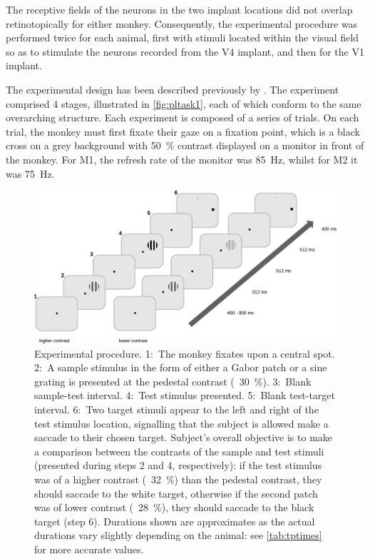 The receptive fields of the neurons in the two implant locations did not overlap retinotopically for either monkey.
Consequently, the experimental procedure was performed twice for each animal, first with stimuli located within the visual field so as to stimulate the neurons recorded from the \ac{V4} implant, and then for the \ac{V1} implant.

The experimental design has been described previously by \cite{Chen2013,Chen2014}.
The experiment comprised 4 stages, illustrated in \autoref{fig:pltask1}, each of which conform to the same overarching structure.
Each experiment is composed of a series of trials.
On each trial, the monkey must first fixate their gaze on a fixation point, which is a black cross on a grey background with \SI{50}{\percent} contrast displayed on a monitor in front of the monkey.
For \ac{M1}, the refresh rate of the monitor was \SI{85}{Hz}, whilst for \ac{M2} it was \SI{75}{Hz}.

\begin{figure}[htbp]
\begin{center}
\includegraphics[width=\linewidth]{figs/info/PLtask1.pdf}
\end{center}
\caption{
Experimental procedure.
1:~The monkey fixates upon a central spot.
2:~A sample stimulus in the form of either a Gabor patch or a sine grating is presented at the pedestal contrast (\eg{}~\SI{30}{\percent}).
3:~Blank sample-test interval.
4:~Test stimulus presented.
5:~Blank test-target interval.
6:~Two target stimuli appear to the left and right of the test stimulus location, signalling that the subject is allowed make a saccade to their chosen target.
Subject's overall objective is to make a comparison between the contrasts of the sample and test stimuli (presented during steps 2 and 4, respectively): if the test stimulus was of a higher contrast (\eg{}~\SI{32}{\percent}) than the pedestal contrast, they should saccade to the white target, otherwise if the second patch was of lower contrast (\eg{}~\SI{28}{\percent}), they should saccade to the black target (step 6).
Durations shown are approximates as the actual durations vary slightly depending on the animal: see \autoref{tab:tptimes} for more accurate values.}
\label{fig:pltask1}
\end{figure}

